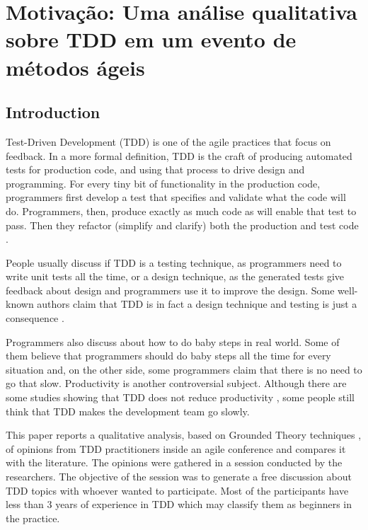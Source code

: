 \chapter{Motivação: Uma análise qualitativa sobre TDD em um evento de métodos ágeis}
\label{cap:motivacao}

\section{Introduction}

Test-Driven Development (TDD) is one of the agile practices
that focus on feedback. 
In a more formal definition, TDD is the craft of
producing automated tests for production code, and using that process to drive 
design and programming. For every tiny bit of functionality in
the production code, programmers first develop a test that specifies and
validate what the code will do. Programmers, then, produce exactly as much code 
as will enable that test to pass. Then they refactor (simplify and clarify) both
the production and test code \cite{tdd-aa}.

People usually discuss if TDD is a testing technique, as programmers
need to write unit tests all the time,
or a design technique, as the generated tests give feedback about design and 
programmers use it to improve the design.
Some well-known authors claim that TDD is in fact a design technique and testing
is just a consequence \cite{bob-martin}.

Programmers also discuss about how to do baby steps in real world. Some of them
believe that programmers should do baby steps all the time for every situation
and, on the other side, some programmers claim that there is no need to go that
slow.
Productivity is another controversial subject. Although there are some
studies showing that TDD does not reduce productivity \cite{george-williams} 
\cite{erdogmus}, some people still think that TDD makes the development team go
slowly.

This paper reports a qualitative analysis, based on Grounded 
Theory techniques \cite{grounded-theory}, of opinions from TDD practitioners
inside an agile conference and compares it with the literature.
The opinions were gathered in a session conducted by the researchers. 
The objective of the session was to generate a free discussion about TDD topics
with whoever wanted to participate. Most of the participants have less than 3 years of
experience in TDD which may classify them as beginners in the practice. 

